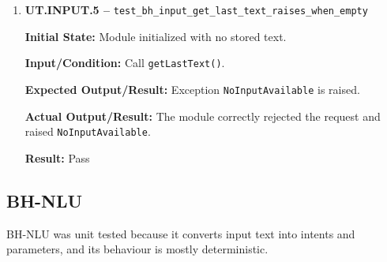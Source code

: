 \documentclass[12pt]{article}
\begin{document}
\begin{enumerate}
    \textbf{Input/Condition:} Call \texttt{stopCapture()}.
    
    \textbf{Expected Output/Result:} State returns to Idle.
    
    \textbf{Actual Output/Result:} The module stopped capture
    correctly and returned to the Idle state.
    
    \textbf{Result:} Pass
    
    \item \textbf{UT.INPUT.5 --}
    \texttt{test\_bh\_input\_get\_last\_text\_raises\_when\_empty}
    
    \textbf{Initial State:} Module initialized with no stored text.
    
    \textbf{Input/Condition:} Call \texttt{getLastText()}.
    
    \textbf{Expected Output/Result:} Exception
    \texttt{NoInputAvailable} is raised.
    
    \textbf{Actual Output/Result:} The module correctly rejected the
    request and raised \texttt{NoInputAvailable}.
    
    \textbf{Result:} Pass
\end{enumerate}

\subsection{BH-NLU}

BH-NLU was unit tested because it converts input text into intents and
parameters, and its behaviour is mostly deterministic.
\end{document}
